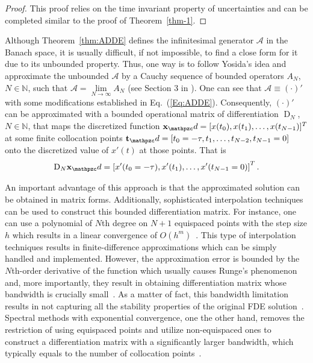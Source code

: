 \documentclass[journal]{IEEEtran}
\def \disc { \mathpzc d}
\def\A{ \mathcal A }
\begin{document}
\begin{proof}
	This proof relies on the time invariant property of uncertainties and can be completed similar to the proof of Theorem~\ref{thm-1}.
\end{proof}

Although Theorem~\ref{thm:ADDE} defines the infinitesimal generator $ \A $ in the Banach space, it is usually difficult, if not impossible, to find a close form for it due to its unbounded property. Thus, one way is to follow Yosida's idea and approximate the unbounded $ \A $ by a Cauchy sequence of bounded operators $ A_N $, $ N\in \mathbb N $, such that $\A=\lim\limits_{N\to \infty}   A_N$ (see Section 3 in \cite{Engel1999one}). One can see that $  \mathcal A \equiv (\cdot)'  $ with some modifications established in Eq.~(\ref{Eq:ADDE}). Consequently, $ (\cdot)' $ can be approximated with a bounded operational matrix of differentiation $ \operatorname{D}_{N} $, $ N \in \mathbb N $, that maps the discretized function $ \mathbf x_\disc =[x(t_0),x(t_1),\ldots,x(t_{N-1})]^T$ at some finite collocation points $ \mathbf t_\disc=[t_0=-\tau,t_1,\ldots,t_{N-2},t_{N-1}=0] $ onto the discretized value of $ x'(t) $ at those points. That is
\begin{eqnarray}\label{Eq:FCDM}
	{\operatorname{D}_{N}} {\mathbf{x}_\disc} = \left[
		x'(t_0=-\tau) ,
		x'(t_1),
		\ldots,
		x'(t_{N-1}=0)
		\right]^T.
\end{eqnarray}

An important advantage of this approach is that the approximated solution can be obtained in matrix forms. Additionally, sophisticated interpolation techniques can be used to construct this bounded differentiation matrix. For instance, one can use a polynomial of $ N $th degree on $ N+1 $ equispaced points with the step size $ h $ which results in a linear convergence of $ O(h^m) $~\cite{Trefethen2000spectral}. This type of interpolation techniques results in finite-difference approximations which can be simply handled and implemented. However, the approximation error is bounded by the $ N $th-order derivative of the function which usually causes Runge's phenomenon~\cite{Trefethen2000spectral} and, more importantly, they result in obtaining differentiation matrix whose bandwidth is crucially small~\cite{Dabiri2016EfficientFCDMs}. As a matter of fact, this bandwidth limitation results in not capturing all the stability properties of the original FDE solution~\cite{Dabiri2017RECCA}. Spectral methods with exponential convergence, one the other hand, removes the restriction of using equispaced points and utilize non-equispaced ones to construct a differentiation matrix with a significantly larger bandwidth, which typically equals to the number of collocation points~\cite{Dabiri2016EfficientFCDMs}.
\end{document}
